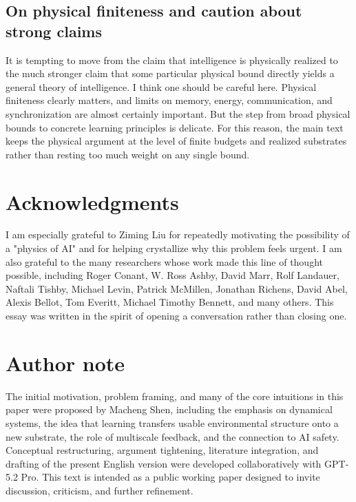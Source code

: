 \documentclass[11pt]{article}
\begin{document}
\subsection{On physical finiteness and caution about strong claims}


It is tempting to move from the claim that intelligence is physically realized to the much stronger claim that some particular physical bound directly yields a general theory of intelligence. I think one should be careful here. Physical finiteness clearly matters, and limits on memory, energy, communication, and synchronization are almost certainly important. But the step from broad physical bounds to concrete learning principles is delicate. For this reason, the main text keeps the physical argument at the level of finite budgets and realized substrates rather than resting too much weight on any single bound.

\section*{Acknowledgments}


I am especially grateful to Ziming Liu for repeatedly motivating the possibility of a "physics of AI" and for helping crystallize why this problem feels urgent. I am also grateful to the many researchers whose work made this line of thought possible, including Roger Conant, W. Ross Ashby, David Marr, Rolf Landauer, Naftali Tishby, Michael Levin, Patrick McMillen, Jonathan Richens, David Abel, Alexis Bellot, Tom Everitt, Michael Timothy Bennett, and many others. This essay was written in the spirit of opening a conversation rather than closing one.

\section*{Author note}


The initial motivation, problem framing, and many of the core intuitions in this paper were proposed by Macheng Shen, including the emphasis on dynamical systems, the idea that learning transfers usable environmental structure onto a new substrate, the role of multiscale feedback, and the connection to AI safety. Conceptual restructuring, argument tightening, literature integration, and drafting of the present English version were developed collaboratively with GPT-5.2 Pro. This text is intended as a public working paper designed to invite discussion, criticism, and further refinement.
\end{document}
